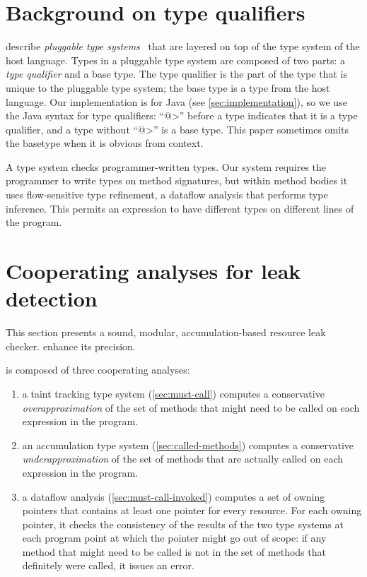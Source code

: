 \section{Background on type qualifiers}
\label{sec:background}

 describe
\emph{pluggable type systems}~\cite{FosterFFA99}
that are layered on top of the type system of the host
language.  Types in a pluggable type system are composed of two parts:
a \emph{type qualifier} and a base type. The type qualifier is the
part of the type that is unique to the pluggable type system; the base
type is a type from the host language. Our implementation is for Java
(see \cref{sec:implementation}), so we use the Java syntax for type
qualifiers: ``\<@>'' before a type indicates that it is a type
qualifier, and a type without ``\<@>'' is a base type.
This paper sometimes omits the basetype when it is obvious from context.

A type system checks programmer-written types.  Our system requires the
programmer to write types on method signatures, but within method bodies it
uses flow-sensitive type refinement, a dataflow analysis that performs type
inference.  This permits an expression to have different types on different
lines of the program.



\section{Cooperating analyses for leak detection}
\label{sec:base-type-systems}

This section presents a sound, modular, accumulation-based
resource leak checker.
enhance its precision.

\Tool is composed of three cooperating analyses:
\begin{enumerate}
\item a taint tracking type system (\cref{sec:must-call}) computes a conservative
  \emph{overapproximation} of the set of methods that might need to be called
  on each expression in the program.
\item an accumulation type system (\cref{sec:called-methods}) computes
  a conservative \emph{underapproximation} of the set of methods that are
  actually called on each expression in the program.
\item a dataflow analysis (\cref{sec:must-call-invoked}) computes a set
  of owning pointers that contains at least one pointer for every resource.
  For each owning pointer, it checks the consistency of the results
  of the two type systems at each program
  point at which the pointer might go out of scope:
  if any method that might need to be called is not in the set of methods
  that definitely were called, it issues an error.
\end{enumerate}

